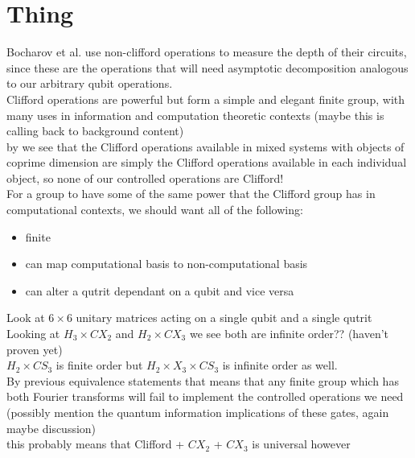 \documentclass[]{article}
\begin{document}
\section{Thing}

Bocharov et al. use non-clifford operations to measure the depth of their circuits, since these are the operations that will need asymptotic decomposition analogous to our arbitrary qubit operations.
\\Clifford operations are powerful but form a simple and elegant finite group, with many uses in information and computation theoretic contexts (maybe this is calling back to background content)
\\by \cite{tolar-clifford} we see that the Clifford operations available in mixed systems with objects of coprime dimension are simply the Clifford operations available in each individual object, so none of our controlled operations are Clifford!
\\For a group to have some of the same power that the Clifford group has in computational contexts, we should want all of the following:
\begin{itemize}
	\item finite
	\item can map computational basis to non-computational basis
	\item can alter a qutrit dependant on a qubit and vice versa
\end{itemize}
Look at $6\times 6$ unitary matrices acting on a single qubit and a single qutrit
\\Looking at $H_3 \times CX_2$ and $H_2 \times CX_3$ we see both are infinite order?? (haven't proven yet)
\\$H_2 \times CS_3$ is finite order but $H_2 \times X_3 \times CS_3$ is infinite order as well.
\\By previous equivalence statements that means that any finite group which has both Fourier transforms will fail to implement the controlled operations we need
\\(possibly mention the quantum information implications of these gates, again maybe discussion)
\\this probably means that Clifford + $CX_2$ + $CX_3$ is universal however
\end{document}
